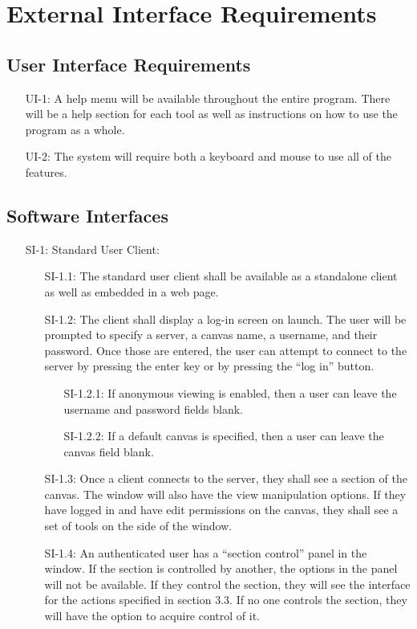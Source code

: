 \documentclass[11pt,oneside,a4paper]{article}
\begin{document}
\section{External Interface Requirements}
\subsection{User Interface Requirements}
\begin{itemize}
\item[UI-1:] A help menu will be available throughout the entire program. There will be a help section for each tool as well as instructions on how to use the program as a whole.
\item[UI-2:] The system will require both a keyboard and mouse to use all of the features.
\end{itemize}
\subsection{Software Interfaces}
\begin{itemize}
\item[SI-1:] Standard User Client:
\begin{itemize}
\item[SI-1.1:] The standard user client shall be available as a standalone client as well as embedded in a web page.
\item[SI-1.2:] The client shall display a log-in screen on launch. The user will be prompted to specify a server, a canvas name, a username, and their password. Once those are entered, the user can attempt to connect to the server by pressing the enter key or by pressing the “log in” button.  
\begin{itemize}
\item[SI-1.2.1:] If anonymous viewing is enabled, then a user can leave the username and password fields blank.
\item[SI-1.2.2:] If a default canvas is specified, then a user can leave the canvas field blank.
\end{itemize}
\item[SI-1.3:] Once a client connects to the server, they shall see a section of the canvas. The window will also have the view manipulation options. If they have logged in and have edit permissions on the canvas, they shall see a set of tools on the side of the window.
\item[SI-1.4:] An authenticated user has a “section control” panel in the window. If the section is controlled by another, the options in the panel will not be available. If they control the section, they will see the interface for the actions specified in section 3.3. If no one controls the section, they will have the option to acquire control of it.
\end{itemize}
\end{itemize}
\end{document}
